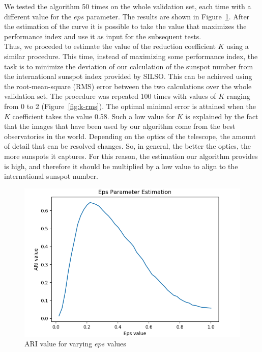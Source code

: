 We tested the algorithm 50 times on the whole validation set, each time with a different value for the $eps$ parameter. The results are shown in Figure~\ref{fig:eps-ari}. After the estimation of the curve it is possible to take the value that maximizes the performance index and use it as input for the subsequent tests.\\
Thus, we proceded to estimate the value of the reduction coefficient $K$ using a similar procedure. This time, instead of maximizing some performance index, the task is to minimize the deviation of our calculation of the sunspot number from the international sunspot index provided by SILSO. This can be achieved using the root-mean-square (RMS) error between the two calculations over the whole validation set. The procedure was repeated 100 times with values of $K$ ranging from 0 to 2 (Figure~\ref{fig:k-rms}). The optimal minimal error is attained when the $K$ coefficient takes the value 0.58. Such a low value for $K$ is explained by the fact that the images that have been used by our algorithm come from the best observatories in the world. Depending on the optics of the telescope, the amount of detail that can be resolved changes. So, in general, the better the optics, the more sunspots it captures. For this reason, the estimation our algorithm provides is high, and therefore it should be multiplied by a low value to align to the international sunspot number.\clearpage
\begin{figure}[ht!]
  \centering
  \captionsetup{justification=centering}
  \includegraphics[width=\textwidth]{./pictures/eps-ari-copy}
  \caption{ARI value for varying $eps$ values}
  \label{fig:eps-ari}
\end{figure}
